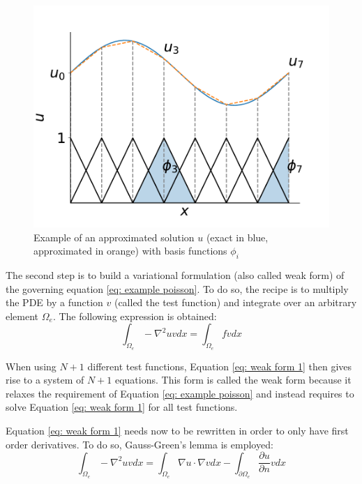 \begin{figure}
    \centering
    \includegraphics[width=\linewidth]{Figures/Chapter2/approximated_solution.pdf}
    \caption{Example of an approximated solution $u$ (exact in blue, approximated in orange) with basis functions $\phi_i$}
    \label{fig: example approximated solution}
\end{figure}


The second step is to build a variational formulation (also called weak form) of the governing equation \ref{eq: example poisson}.
To do so, the recipe is to multiply the PDE by a function $v$ (called the test function) and integrate over an arbitrary element $\Omega_e$.
The following expression is obtained:
\begin{equation}
    \int_{\Omega_e} -\nabla^2 u v dx = \int_{\Omega_e} f v dx
    \label{eq: weak form 1}
\end{equation}

When using $N+1$ different test functions, Equation \ref{eq: weak form 1} then gives rise to a system of $N+1$ equations.
This form is called the weak form because it relaxes the requirement of Equation \ref{eq: example poisson} and instead requires to solve Equation \ref{eq: weak form 1} for all test functions.

Equation \ref{eq: weak form 1} needs now to be rewritten in order to only have first order derivatives.
To do so, Gauss-Green's lemma is employed:
\begin{equation}
    \int_{\Omega_e} -\nabla^2 u v dx = \int_{\Omega_e} \nabla u \cdot \nabla v dx - \int_{\partial \Omega_e} \frac{\partial u}{\partial n} v dx
    \label{eq: gauss-green}
\end{equation}

